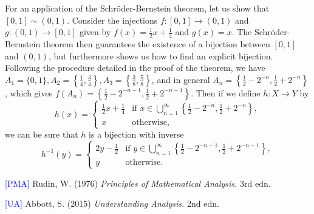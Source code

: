 \documentclass[12pt]{article}
\theoremstyle{definition}
\begin{document}
For an application of the Schröder-Bernstein theorem, let us show that \( [0, 1] \sim (0, 1) \). Consider the injections \( f : [0, 1] \to (0, 1) \) and \( g : (0, 1) \to [0, 1] \) given by \( f(x) = \tfrac{1}{2}x + \tfrac{1}{4} \) and \( g(x) = x \). The Schröder-Bernstein theorem then guarantees the existence of a bijection between \( [0, 1] \) and \( (0, 1) \), but furthermore shows us how to find an explicit bijection. Following the procedure detailed in the proof of the theorem, we have \( A_1 = \{ 0, 1 \}, A_2 = \left\{ \tfrac{1}{4}, \tfrac{3}{4} \right\}, A_3 = \left\{ \tfrac{3}{8}, \tfrac{5}{8} \right\} \), and in general \( A_n = \left\{ \tfrac{1}{2} - 2^{-n}, \tfrac{1}{2} + 2^{-n} \right\} \), which gives \( f(A_n) = \left\{ \tfrac{1}{2} - 2^{-n-1}, \tfrac{1}{2} + 2^{-n-1} \right\} \). Then if we define \( h : X \to Y \) by
\[
    h(x) = \begin{cases}
        \tfrac{1}{2}x + \tfrac{1}{4} & \text{if } x \in \bigcup_{n=1}^{\infty} \left\{ \tfrac{1}{2} - 2^{-n}, \tfrac{1}{2} + 2^{-n} \right\}, \\
        x & \text{otherwise},
    \end{cases}
\]
we can be sure that \( h \) is a bijection with inverse
\[
    h^{-1}(y) = \begin{cases}
        2y - \tfrac{1}{2} & \text{if } y \in \bigcup_{n=1}^{\infty} \left\{ \tfrac{1}{2} - 2^{-n-1}, \tfrac{1}{2} + 2^{-n-1} \right\}, \\
        y & \text{otherwise}.
    \end{cases}
\]

\noindent \hrulefill

\noindent \hypertarget{pma}{\textcolor{blue}{[PMA]} Rudin, W. (1976) \textit{Principles of Mathematical Analysis.} 3rd edn.}

\noindent \hypertarget{ua}{\textcolor{blue}{[UA]} Abbott, S. (2015) \textit{Understanding Analysis.} 2nd edn.}
\end{document}
